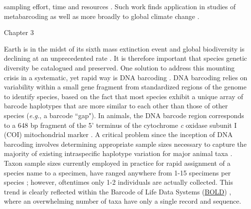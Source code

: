 sampling effort, time and resources \cite{hortal2005ed}. Such work finds application in studies of metabarcoding \cite{wares2015can} as well as more broadly to global climate change \cite{pfenninger2012methodological}.





Chapter 3

Earth is in the midst of its sixth mass extinction event and global biodiversity is \\ declining at an unprecedented rate \cite{ceballos2015accelerated}. It is therefore important that species genetic \\ diversity be catalogued and preserved. One solution to address this mounting crisis in a systematic, yet rapid way is DNA barcoding \cite{hebert2003biological}. DNA barcoding relies on variability within a small gene fragment from standardized regions of the genome to identify species, based on the fact that most species exhibit a unique array of barcode haplotypes that are more similar to each other than those of other species (\textit{e.g.}, a barcode ``gap"). In animals, the DNA barcode region corresponds to a 648 bp fragment of the 5' terminus of the cytochrome \textit{c} oxidase subunit I (COI) mitochondrial marker \cite{hebert2003biological, hebert2003barcoding}. A critical problem since the inception of DNA barcoding involves determining appropriate sample sizes necessary to capture the majority of existing intraspecific haplotype variation for major animal taxa \cite{hebert2004identification, meyer2005dna, ward2005dna}. Taxon sample sizes currently employed in practice for rapid assignment of a species name to a specimen, have ranged anywhere from 1-15 specimens per species \cite{goodall2012comparison, jin2012simple, matz2005likelihood, ross2008testing, yao2017evaluating}; however, oftentimes only 1-2 individuals are actually collected. This trend is clearly reflected within the Barcode of Life Data Systems (\href{http://www.boldsystems.org}{BOLD}) \cite{ratnasingham2007bold}, where an overwhelming number of taxa have only a single record and sequence.

 

